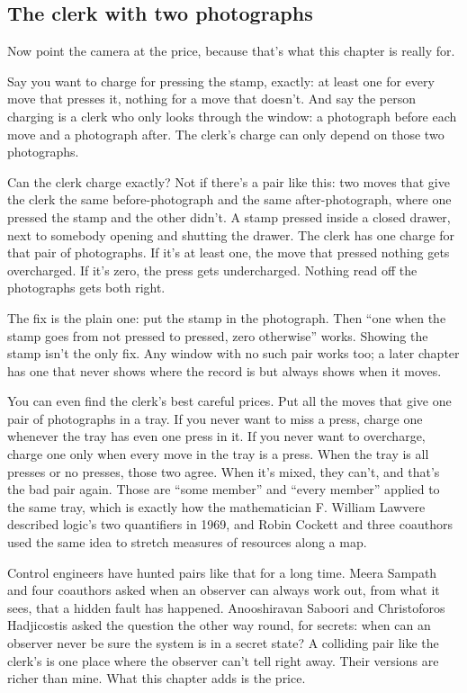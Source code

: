 \documentclass[11pt,twoside]{article}
\theoremstyle{thielethm}
\theoremstyle{thieledef}
\theoremstyle{thieledef}
\theoremstyle{thieledef}
\theoremstyle{thielethm}
\theoremstyle{thieleobs}
\theoremstyle{thielethm}
\begin{document}
\subsection{The clerk with two photographs}

Now point the camera at the price, because that's what this chapter is really for.

Say you want to charge for pressing the stamp, exactly: at least one for every move that presses it, nothing for a move that doesn't. And say the person charging is a clerk who only looks through the window: a photograph before each move and a photograph after. The clerk's charge can only depend on those two photographs.

Can the clerk charge exactly? Not if there's a pair like this: two moves that give the clerk the same before-photograph and the same after-photograph, where one pressed the stamp and the other didn't. A stamp pressed inside a closed drawer, next to somebody opening and shutting the drawer. The clerk has one charge for that pair of photographs. If it's at least one, the move that pressed nothing gets overcharged. If it's zero, the press gets undercharged. Nothing read off the photographs gets both right.

The fix is the plain one: put the stamp in the photograph. Then ``one when the stamp goes from not pressed to pressed, zero otherwise'' works. Showing the stamp isn't the only fix. Any window with no such pair works too; a later chapter has one that never shows where the record is but always shows when it moves.

You can even find the clerk's best careful prices. Put all the moves that give one pair of photographs in a tray. If you never want to miss a press, charge one whenever the tray has even one press in it. If you never want to overcharge, charge one only when every move in the tray is a press. When the tray is all presses or no presses, those two agree. When it's mixed, they can't, and that's the bad pair again. Those are ``some member'' and ``every member'' applied to the same tray, which is exactly how the mathematician F. William Lawvere described logic's two quantifiers in 1969, and Robin Cockett and three coauthors used the same idea to stretch measures of resources along a map.

Control engineers have hunted pairs like that for a long time. Meera Sampath and four coauthors asked when an observer can always work out, from what it sees, that a hidden fault has happened. Anooshiravan Saboori and Christoforos Hadjicostis asked the question the other way round, for secrets: when can an observer never be sure the system is in a secret state? A colliding pair like the clerk's is one place where the observer can't tell right away. Their versions are richer than mine. What this chapter adds is the price.
\end{document}
